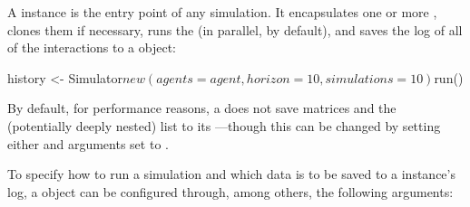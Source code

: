 \documentclass{jss}
\begin{document}
A  instance is the entry point of any  simulation. It encapsulates one or more , clones them if necessary, runs the  (in parallel, by default), and saves the log of all of the  interactions to a  object:

\begin{Code}
history <- Simulator$new(agents = agent, horizon = 10, simulations = 10)$run()
\end{Code}

By default, for performance reasons, a  does not save  matrices and the (potentially deeply nested)  list to its ---though this can be changed  by setting either  and  arguments set to .

To specify how to run a simulation and which data is to be saved to a  instance's  log, a  object can be configured through, among others, the following arguments:
\end{document}
